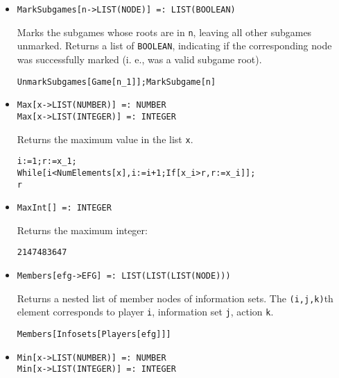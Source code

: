 \begin{itemize}
\item{}
\protect \large \begin{verbatim}
MarkSubgames[n->LIST(NODE)] =: LIST(BOOLEAN) 
\end{verbatim}\normalsize

\bd 
Marks the subgames whose roots are in \verb+n+, leaving all other
subgames unmarked.  Returns a list of \verb+BOOLEAN+, indicating if
the corresponding node was successfully marked (i. e., was a valid
subgame root).
\begin{verbatim}
UnmarkSubgames[Game[n_1]];MarkSubgame[n]
\end{verbatim} 
\ed

\item{}
\protect \large \begin{verbatim}
Max[x->LIST(NUMBER)] =: NUMBER 
Max[x->LIST(INTEGER)] =: INTEGER 
\end{verbatim}\normalsize

\bd 
Returns the maximum value in the list \verb+x+.  
\begin{verbatim}
i:=1;r:=x_1;
While[i<NumElements[x],i:=i+1;If[x_i>r,r:=x_i]];
r
\end{verbatim} 
\ed


\item{}
\protect \large \begin{verbatim}
MaxInt[] =: INTEGER 
\end{verbatim}\normalsize

\bd 
Returns the maximum integer:
\begin{verbatim}
2147483647
\end{verbatim} 
\ed


\item{}
\protect \large \begin{verbatim}
Members[efg->EFG] =: LIST(LIST(LIST(NODE))) 
\end{verbatim}\normalsize

\bd 
Returns a nested list of member nodes of information sets.  The
\verb+(i,j,k)+th element corresponds to player \verb+i+, information
set \verb+j+, action \verb+k+.  
\begin{verbatim}
Members[Infosets[Players[efg]]]
\end{verbatim} 
\ed

\item{}
\protect \large \begin{verbatim}
Min[x->LIST(NUMBER)] =: NUMBER 
Min[x->LIST(INTEGER)] =: INTEGER 
\end{verbatim}\normalsize


\end{itemize}
